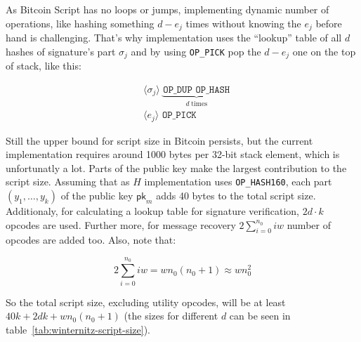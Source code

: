\documentclass{iacrtrans}
\newcommand{\elem}[1]{\, \langle #1 \rangle \,}
\newcommand{\opcode}[1]{\, \texttt{#1} \,}
\begin{document}
As Bitcoin Script has no loops or jumps, implementing dynamic number
of operations, like hashing something $d - e_j$ times without knowing
the $e_j$ before hand is challenging. That's why implementation uses
the ``lookup'' table of all $d$ hashes of signature's part $\sigma_j$ and
by using \texttt{OP\_PICK} pop the $d - e_j$ one on the top of stack,
like this:

\begin{empheqboxed}
  \begin{align*}
    & \elem{\sigma_j} \underbrace{\opcode{OP\_DUP}
    \opcode{OP\_HASH}}_{d \; \text{times}} \\
    & \elem{e_j} \opcode{OP\_PICK}
  \end{align*}
\end{empheqboxed}

Still the upper bound for script size in Bitcoin persists, but the
current implementation requires around 1000 bytes per 32-bit stack
element, which is unfortunatly a lot. Parts of the public key make the
largest contribution to the script size. Assuming that as $H$
implementation uses \texttt{OP\_HASH160}, each part $(y_1,\dots,y_k)$
of the public key $\mathsf{pk}_{m}$ adds 40 bytes to the total script
size. Additionaly, for calculating a lookup table for signature
verification, $2d \cdot k$ opcodes are used. Further more, for message
recovery $2 \sum_{i = 0}^{n_0} i w$ number of opcodes are added
too. Also, note that:

\begin{equation}
  \label{eq:opcodes-for-recovery-number}
    2 \sum_{i = 0}^{n_0} i w = w n_0 (n_0+1) \approx w n_0^2
\end{equation}

So the total script size, excluding utility opcodes, will be at least
$40k + 2 d k + w n_0 (n_0+1)$ (the sizes for different $d$ can be seen
in table~\ref{tab:winternitz-script-size}).
\end{document}
